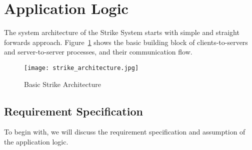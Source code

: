 \documentclass[dareport.tex]{subfiles}
\begin{document}
\section{Application Logic}
The system architecture of the Strike System starts with simple and straight forwards approach. Figure~\ref{fig:strike_arch} shows the basic building block of clients-to-servers and server-to-server processes, and their communication flow.

\begin{figure}[h]
\texttt{[image: strike\_architecture.jpg]}
\centering
\caption{Basic Strike Architecture}
\label{fig:strike_arch}
\centering
\end{figure}

\subsection{Requirement Specification}
To begin with, we will discuss the requirement specification and assumption of the application logic. 
\end{document}
